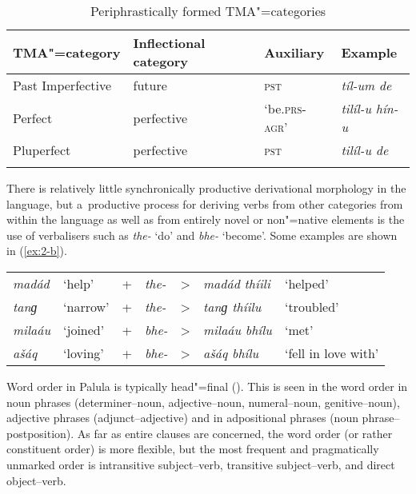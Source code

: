 \begin{table}[ht]
\caption{Periphrastically formed TMA"=categories}
\begin{tabularx}{\textwidth}{ l l Q Q }
\lsptoprule
TMA"=category &
Inflectional category &
Auxiliary &
Example \\\hline
Past Imperfective &
future &
\textsc{pst} &
\textit{tíl-um de} \\
Perfect &
perfective &
`be.\textsc{prs-agr}' &
\textit{tilíl-u hín-u} \\
Pluperfect &
perfective &
\textsc{pst} &
\textit{tilíl-u de} \\\lspbottomrule
\end{tabularx}
\label{tab:2-peri}
\end{table}


There is relatively little synchronically productive derivational morphology in the language, but a~productive process for deriving verbs from other categories from within the language as well as from entirely novel or non"=native elements is the use of verbalisers such as \textit{the-} `do' and \textit{bhe-} `become'. Some examples are shown in (\ref{ex:2-b}).


\begin{exe}
\extab
\label{ex:2-b}
\begin{tabularx}{116mm}{ l l l l l l l}
\textit{madád} &
`help' &
+ &
\textit{the-} &
{\textgreater} &
\textit{madád thíili} &
`helped'\\
\textit{tanɡ} &
`narrow' &
+ &
\textit{the-} &
{\textgreater} &
\textit{tanɡ thíilu} &
`troubled'\\
\textit{milaáu} &
`joined' &
+ &
\textit{bhe-} &
{\textgreater} &
\textit{milaáu bhílu} &
`met'\\
\textit{ašáq} &
`loving' &
+ &
\textit{bhe-} &
{\textgreater} &
\textit{ašáq bhílu} &
`fell in love with'\\
\end{tabularx}
\end{exe}


Word order in Palula is typically head"=final (). This is seen in the word order in noun phrases (determiner--noun, adjective--noun, numeral--noun, genitive--noun), adjective phrases (adjunct--adjective) and in adpositional phrases (noun phrase--postposition). As far as entire clauses are concerned, the word order (or rather constituent order) is more flexible, but the most frequent and pragmatically unmarked order is intransitive subject--verb, transitive subject--verb, and direct object--verb.


